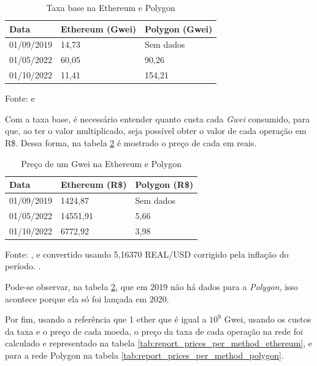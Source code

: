 \begin{table}[!h]
\centering
\caption{Taxa base na Ethereum e Polygon}
\label{tab:report_gwei_price}
\begin{tabular}{@{}lll@{}}
\toprule
Data  & Ethereum (Gwei) & Polygon (Gwei) \\ \midrule
01/09/2019  & 14,73 & Sem dados \\ 
01/05/2022  & 60,05 & 90,26 \\ 
01/10/2022  & 11,41 & 154,21 \\ \bottomrule
\end{tabular}
\begin{tablenotes}
  \small
  \item Fonte: \cite{ethereum_gwei_price} e \cite{polygon_gwei_price}
\end{tablenotes}
\end{table}

Com a taxa base, é necessário entender quanto custa cada \textit{Gwei} consumido, para que, ao ter o valor multiplicado, seja possível obter o valor de cada operação em R\$. Dessa forma, na tabela \ref{tab:report_gwei_to_real} é mostrado o preço de cada  em reais.

\begin{table}[!h]
\centering
\caption{Preço de um Gwei na Ethereum e Polygon}
\label{tab:report_gwei_to_real}
\begin{tabular}{@{}lll@{}}
\toprule
Data  & Ethereum (R\$) & Polygon (R\$) \\ \midrule
01/09/2019  & 1424,87 & Sem dados \\ 
01/05/2022  & 14551,91 & 5,66 \\ 
01/10/2022  & 6772,92 & 3,98 \\ \bottomrule
\end{tabular}
\begin{tablenotes}
  \small
  \item Fonte: \cite{ethereum_price_2019}, \cite{ethereum_price_2022} e \cite{ethereum_price_10_2022} convertido usando 5,16370 REAL/USD corrigido pela inflação do período. \cite{inflation_calculator}.
\end{tablenotes}
\end{table}

Pode-se observar, na tabela \ref{tab:report_gwei_to_real}, que em 2019 não há dados para a \textit{Polygon}, isso acontece porque ela só foi lançada em 2020.

Por fim, usando a referência que 1 ether que é igual a \(10^9\) Gwei, usando os custos da taxa e o preço de cada moeda, o preço da taxa de cada operação na rede  foi calculado e representado na tabela \ref{tab:report_prices_per_method_ethereum}, e para a rede Polygon na tabela \ref{tab:report_prices_per_method_polygon}.

